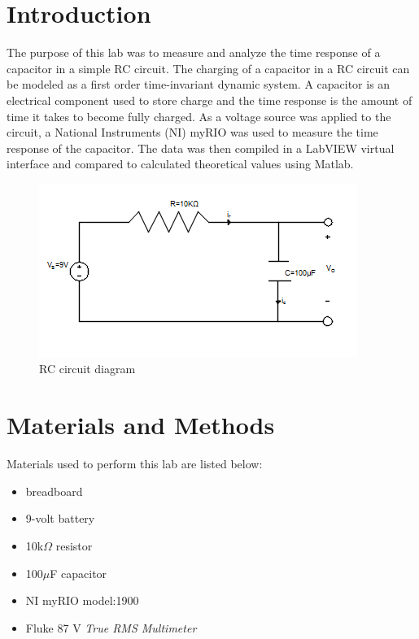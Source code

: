 \documentclass[10pt,twocolumn]{article}
\begin{document}

\section{Introduction}

The purpose of this lab was to measure and analyze the time response of a capacitor in a simple RC circuit. The charging of a capacitor in a RC circuit can be modeled as a first order time-invariant dynamic system. A capacitor is an electrical component used to store charge and the time response is the amount of time it takes to become fully charged. As a voltage source was applied to the circuit, a National Instruments (NI) myRIO was used to measure the time response of the capacitor. The data was then compiled in a LabVIEW virtual interface and compared to calculated theoretical values using Matlab.

\begin{figure}[h!]
	\centering
	\includegraphics[width=.9\linewidth]{figures/RC.png}
	\caption{RC circuit diagram}
	\label{fig:RC}
\end{figure}

\section{Materials and Methods}

Materials used to perform this lab are listed below:

\begin{itemize}
\item breadboard
\item 9-volt battery
\item 10k$\Omega$ resistor
\item 100$\mu$F capacitor
\item NI myRIO model:1900
\item Fluke 87 V \textit{True RMS Multimeter}
\end{itemize}
\end{document}
